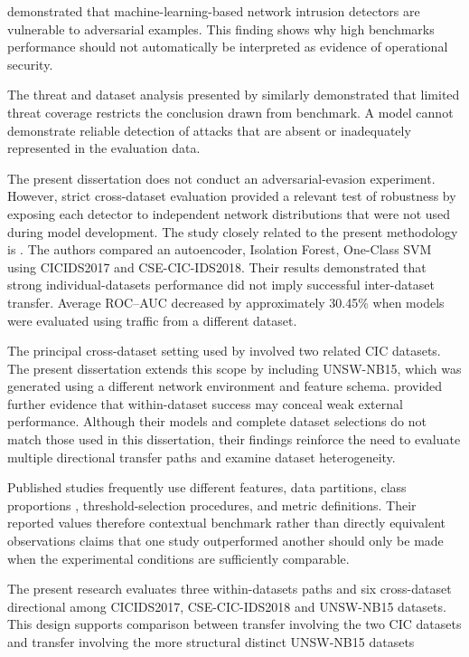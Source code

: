 \cite{Alhajjar2021} demonstrated that machine-learning-based network intrusion detectors are vulnerable to adversarial examples. This finding 
shows why high benchmarks performance should not automatically be interpreted as evidence of operational security.

The threat and dataset analysis presented by \cite{Hindy2020} similarly demonstrated that limited threat coverage restricts the conclusion drawn 
from benchmark. A model cannot demonstrate reliable detection of attacks that are absent or inadequately represented in the evaluation data.   

The present dissertation does not conduct an adversarial-evasion experiment. However, strict cross-dataset evaluation provided a relevant test 
of robustness by exposing each detector to independent network distributions that were not used during model development. The study closely 
related to the present methodology is \cite{Verkerken2022}. The authors compared an autoencoder, Isolation Forest, One-Class SVM using 
CICIDS2017 and CSE-CIC-IDS2018. Their results demonstrated that strong individual-datasets performance did not imply successful inter-dataset 
transfer. Average ROC--AUC decreased by approximately 30.45\% when models were evaluated using traffic from a different dataset.

The principal cross-dataset setting used by \cite{Verkerken2022}  involved two related CIC datasets. The present dissertation extends this 
scope by including UNSW-NB15, which was generated using a different network environment
and feature schema. \cite{Cantone2024} provided further evidence that within-dataset success may conceal weak external performance. Although their models and complete dataset selections do not match those used in this dissertation, their findings reinforce the need to evaluate multiple directional transfer paths and examine dataset heterogeneity.

Published studies frequently use different features, data partitions, class proportions , threshold-selection procedures, and metric definitions. 
Their reported values therefore contextual benchmark rather than directly equivalent observations claims that one study outperformed another 
should only be made when the experimental conditions are sufficiently comparable. 

The present research evaluates three within-datasets paths and six cross-dataset directional among CICIDS2017, CSE-CIC-IDS2018 and UNSW-NB15 
datasets. This design supports comparison between transfer involving the two CIC datasets and transfer involving the more structural distinct 
UNSW-NB15 datasets 
 
